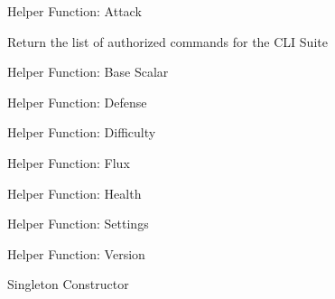 \begin{DoxyRefList}
%
Helper Function\+: Attack  
\item[Member \mbox{\hyperlink{classConfigManager_ae3382cfdaf7e3821de61c118303ff778}{Config\+Manager\+::get\+\_\+authorized\+Commands}} (std\+::vector$<$ std\+::string $>$ \&)]\label{todo__todo000064}%
%
Return the list of authorized commands for the CLI Suite  
\item[Member \mbox{\hyperlink{classConfigManager_a57b0095138267495fa6da6c2147bf70e}{Config\+Manager\+::get\+\_\+base}} ()]\label{todo__todo000066}%
%
Helper Function\+: Base Scalar  
\item[Member \mbox{\hyperlink{classConfigManager_a7da8012593610ab3558103a5f8e0a3cb}{Config\+Manager\+::get\+\_\+defense}} ()]\label{todo__todo000067}%
%
Helper Function\+: Defense  
\item[Member \mbox{\hyperlink{classConfigManager_a93ea2b6222eb97fd706db88f36e3d237}{Config\+Manager\+::get\+\_\+difficulty}} ()]\label{todo__todo000068}%
%
Helper Function\+: Difficulty  
\item[Member \mbox{\hyperlink{classConfigManager_a49bae2cd26a9003f5610a99880fb6422}{Config\+Manager\+::get\+\_\+flux}} ()]\label{todo__todo000069}%
%
Helper Function\+: Flux  
\item[Member \mbox{\hyperlink{classConfigManager_af04d8201e892ce16381403a365f77cae}{Config\+Manager\+::get\+\_\+health}} ()]\label{todo__todo000070}%
%
Helper Function\+: Health  
\item[Member \mbox{\hyperlink{classConfigManager_a15099e62619917e37f6ba8a61e075c43}{Config\+Manager\+::get\+\_\+settings\+Size}} ()]\label{todo__todo000071}%
%
Helper Function\+: Settings  
\item[Member \mbox{\hyperlink{classConfigManager_a7b6225b85d5d0766069cdcaf5e05186c}{Config\+Manager\+::get\+\_\+version}} ()]\label{todo__todo000072}%
%
Helper Function\+: Version  
\item[Member \mbox{\hyperlink{classConfigManager_a7184fa362acea064d406c6efa026a0f4}{Config\+Manager\+::Get\+Instance}} ()]\label{todo__todo000058}%
%
Singleton Constructor  
\item[Member \mbox{\hyperlink{classConfigManager_a15a06af24f82a421d287501d3c28ec53}{Config\+Manager\+::load\+\_\+config}} (bool)]\label{todo__todo000059}%

\end{DoxyRefList}
